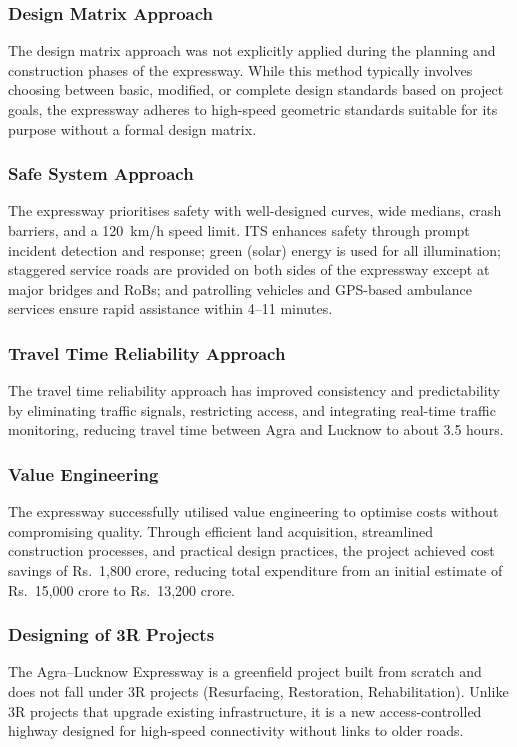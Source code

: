 \documentclass[11pt]{article}
\begin{document}
\subsubsection{Design Matrix Approach}
The design matrix approach was not explicitly applied during the planning and construction phases of
the expressway. While this method typically involves choosing between basic, modified, or complete
design standards based on project goals, the expressway adheres to high-speed geometric standards
suitable for its purpose without a formal design matrix.

\subsubsection{Safe System Approach}
The expressway prioritises safety with well-designed curves, wide medians, crash barriers, and a
120~km/h speed limit. ITS enhances safety through prompt incident detection and response; green
(solar) energy is used for all illumination; staggered service roads are provided on both sides of the
expressway except at major bridges and RoBs; and patrolling vehicles and GPS-based ambulance services
ensure rapid assistance within 4--11 minutes.

\subsubsection{Travel Time Reliability Approach}
The travel time reliability approach has improved consistency and predictability by eliminating traffic
signals, restricting access, and integrating real-time traffic monitoring, reducing travel time between
Agra and Lucknow to about 3.5 hours.

\subsubsection{Value Engineering}
The expressway successfully utilised value engineering to optimise costs without compromising quality.
Through efficient land acquisition, streamlined construction processes, and practical design practices,
the project achieved cost savings of Rs.~1,800 crore, reducing total expenditure from an initial
estimate of Rs.~15,000 crore to Rs.~13,200 crore.

\subsubsection{Designing of 3R Projects}
The Agra--Lucknow Expressway is a greenfield project built from scratch and does not fall under 3R
projects (Resurfacing, Restoration, Rehabilitation). Unlike 3R projects that upgrade existing
infrastructure, it is a new access-controlled highway designed for high-speed connectivity without links
to older roads.
\end{document}
